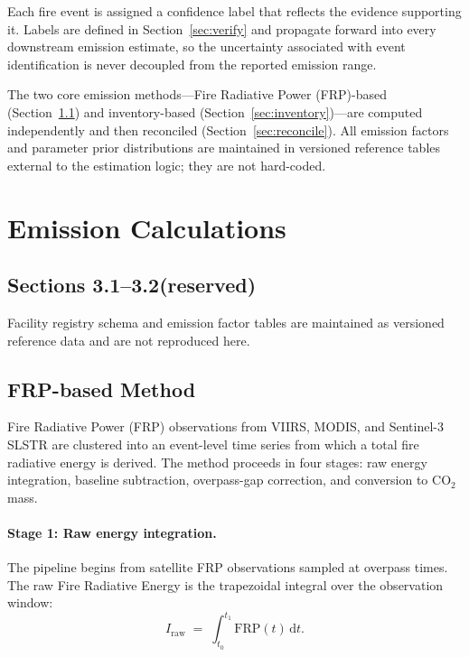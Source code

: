 \documentclass[11pt]{article}
\begin{document}
Each fire event is assigned a confidence label that reflects the evidence
supporting it. Labels are defined in Section~\ref{sec:verify} and propagate
forward into every downstream emission estimate, so the uncertainty
associated with event identification is never decoupled from the reported
emission range.

The two core emission methods---Fire Radiative Power (FRP)-based
(Section~\ref{sec:frp}) and inventory-based
(Section~\ref{sec:inventory})---are computed independently and then
reconciled (Section~\ref{sec:reconcile}). All emission factors and
parameter prior distributions are maintained in versioned reference tables
external to the estimation logic; they are not hard-coded.

\section{Emission Calculations}

\subsection*{Sections 3.1--3.2\enspace(reserved)}
Facility registry schema and emission factor tables are maintained as
versioned reference data and are not reproduced here.

\subsection{FRP-based Method}
\label{sec:frp}

Fire Radiative Power (FRP) observations from VIIRS, MODIS, and Sentinel-3
SLSTR are clustered into an event-level time series from which a total fire
radiative energy is derived. The method proceeds in four stages: raw energy
integration, baseline subtraction, overpass-gap correction, and conversion
to $\mathrm{CO_2}$ mass.

\paragraph{Stage 1: Raw energy integration.}
The pipeline begins from satellite FRP observations sampled at overpass
times. The raw Fire Radiative Energy is the trapezoidal integral over the
observation window:
\begin{equation}
I_{\mathrm{raw}} \;=\; \int_{t_0}^{t_1} \mathrm{FRP}(t)\,\mathrm{d}t.
\label{eq:fre-raw}
\end{equation}
\end{document}
